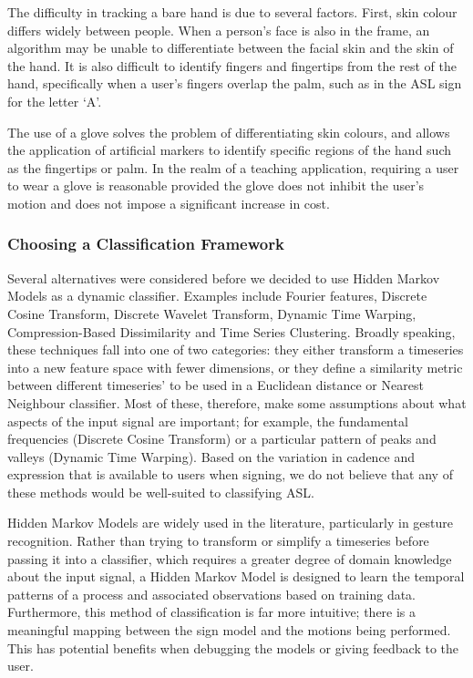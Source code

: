 \documentclass[12pt]{article}
\begin{document}
The difficulty in tracking a bare hand is due to several factors. First, skin colour differs widely between people. When a person’s face is also in the frame, an algorithm may be unable to differentiate between the facial skin and the skin of the hand. It is also difficult to identify fingers and fingertips from the rest of the hand, specifically when a user’s fingers overlap the palm, such as in the ASL sign for the letter ‘A’. 

The use of a glove solves the problem of differentiating skin colours, and allows the application of artificial markers to identify specific regions of the hand such as the fingertips or palm. In the realm of a teaching application, requiring a user to wear a glove is reasonable provided the glove does not inhibit the user’s motion and does not impose a significant increase in cost.

\subsubsection{Choosing a Classification Framework}
Several alternatives were considered before we decided to use Hidden Markov Models as a dynamic classifier. Examples include Fourier features, Discrete Cosine Transform, Discrete Wavelet Transform, Dynamic Time Warping, Compression-Based Dissimilarity and Time Series Clustering. Broadly speaking, these techniques fall into one of two categories: they either transform a timeseries into a new feature space with fewer dimensions, or they define a similarity metric between different timeseries’ to be used in a Euclidean distance or Nearest Neighbour classifier. Most of these, therefore, make some assumptions about what aspects of the input signal are important; for example, the fundamental frequencies (Discrete Cosine Transform) or a particular pattern of peaks and valleys (Dynamic Time Warping). Based on the variation in cadence and expression that is available to users when signing, we do not believe that any of these methods would be well-suited to classifying ASL.

Hidden Markov Models are widely used in the literature, particularly in gesture recognition. Rather than trying to transform or simplify a timeseries before passing it into a classifier, which requires a greater degree of domain knowledge about the input signal, a Hidden Markov Model is designed to learn the temporal patterns of a process and associated observations based on training data. Furthermore, this method of classification is far more intuitive; there is a meaningful mapping between the sign model and the motions being performed. This has potential benefits when debugging the models or giving feedback to the user. 
\end{document}
